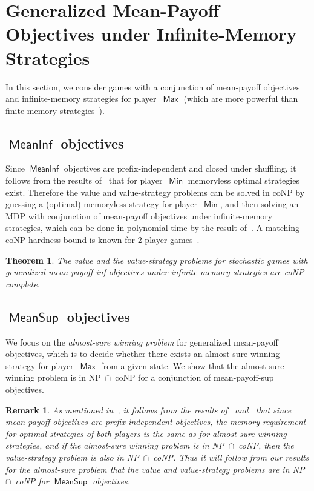 \documentclass{article}
\newtheorem{theorem}{Theorem}
\newtheorem{remark}{Remark}
\DeclareMathOperator{\ma}{\mathsf{Max}}
\DeclareMathOperator{\mi}{\mathsf{Min}}
\newcommand{\MeanSup}{\operatorname{\mathsf{MeanSup}}}
\newcommand{\MeanInf}{\operatorname{\mathsf{MeanInf}}}
\begin{document}
\section{Generalized Mean-Payoff Objectives under Infinite-Memory Strategies}\label{sec:infmem}

In this section, we consider games with a conjunction of mean-payoff objectives
and infinite-memory strategies for player~$\ma$ (which are more powerful than 
finite-memory strategies~\cite[Lemma~7]{VCDHRR15}).








\subsection{$\MeanInf$ objectives}

Since $\MeanInf$ objectives are prefix-independent and closed under shuffling, 
it follows from the results of~\cite[Theorem~5.2]{GK14}
that for player~$\mi$ memoryless optimal strategies exist. Therefore the
value and value-strategy problems can be solved in coNP by guessing a (optimal)
memoryless strategy for player~$\mi$, and then solving an MDP with conjunction
of mean-payoff objectives under infinite-memory strategies, which can be done in 
polynomial time by the result of~\cite[Section~3.2]{BBCFK14}.
A matching coNP-hardness bound is known for 2-player games~\cite[Theorem~7]{VCDHRR15}.

\begin{theorem}\label{theo:mean-payoff-inf-infinite}
The value and the value-strategy problems for stochastic games 
with generalized mean-payoff-inf objectives under infinite-memory 
strategies 
are coNP-complete.
\end{theorem}




\subsection{$\MeanSup$ objectives}

We focus on the \emph{almost-sure winning problem} for generalized mean-payoff objectives, 
which is to decide whether there exists an almost-sure winning strategy 
for player~$\ma$ from a given state.
We show that the almost-sure winning problem is in NP~$\cap$~coNP for a conjunction
of mean-payoff-sup objectives.

\begin{remark}\label{rem:red-almost-sure}
As mentioned in~\cite[Remark~1]{CDGO14}, it follows from the results of~\cite[Lemma~7]{CHH09} 
and~\cite[Theorem~4.1]{GH10} that since mean-payoff objectives are prefix-independent objectives,
the memory requirement for optimal strategies of both players is the same as 
for almost-sure winning strategies, and if the almost-sure winning problem is in 
NP~$\cap$~coNP, then the value-strategy problem is also in 
NP~$\cap$~coNP. Thus it will follow from our results
for the almost-sure problem 
that the value and value-strategy problems are 
in NP~$\cap$~coNP for $\MeanSup$ objectives.
\end{remark}
\end{document}
